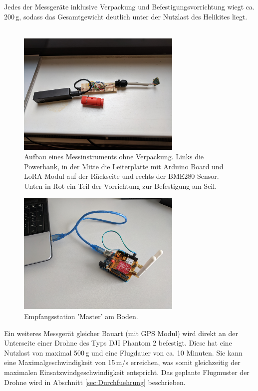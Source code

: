 \documentclass[a4paper,11pt,DIV=calc,tablecaptionabove,headinclude,twoside]{article}
\begin{document}
Jedes der Messgeräte inklusive Verpackung und Befestigungsvorrichtung wiegt ca. 200\,g, sodass das Gesamtgewicht deutlich unter der Nutzlast des Helikites liegt.\\\\
\begin{figure}[t]
	\centering
	\includegraphics[width=0.7\textwidth]{Slave.jpg}
	\captionsetup{width=11cm}
	\caption{Aufbau eines Messinstruments ohne Verpackung. Links die Powerbank, in der Mitte die Leiterplatte mit Arduino Board und LoRA Modul auf der Rückseite und rechts der BME280 Sensor. Unten in Rot ein Teil der Vorrichtung zur Befestigung am Seil.}
	\label{Slave}
\end{figure}
\begin{figure}[t]
	\centering
	\includegraphics[width=0.7\textwidth]{Master.jpg}
	\captionsetup{width=11cm}
	\caption{Empfangsstation 'Master' am Boden.}
	\label{Master}
\end{figure}
Ein weiteres Messgerät gleicher Bauart (mit GPS Modul) wird direkt an der Unterseite einer Drohne des Typs DJI Phantom 2 befestigt. Diese hat eine Nutzlast von maximal 500\,g und eine Flugdauer von ca. 10 Minuten. Sie kann eine Maximalgeschwindigkeit von 15\,m/s erreichen, was somit gleichzeitig der maximalen Einsatzwindgeschwindigkeit entspricht. Das geplante Flugmuster der Drohne wird in Abschnitt \ref{sec:Durchfuehrung} beschrieben. \\\\
\end{document}
